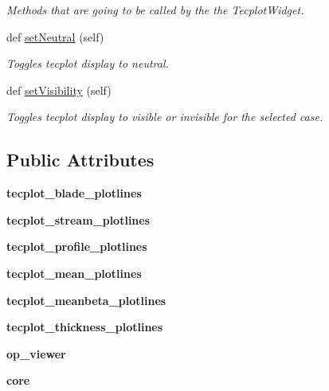 \begin{DoxyCompactItemize}
\begin{DoxyCompactList}\small\item\em Methods that are going to be called by the the Tecplot\+Widget. \end{DoxyCompactList}\item 
def \hyperlink{a00117_ad80163041f7884f536d1421860c4adc2}{set\+Neutral} (self)
\begin{DoxyCompactList}\small\item\em Toggles tecplot display to neutral. \end{DoxyCompactList}\item 
def \hyperlink{a00117_ae50e0f3c4051d791ed30a2e9de5233ea}{set\+Visibility} (self)
\begin{DoxyCompactList}\small\item\em Toggles tecplot display to visible or invisible for the selected case. \end{DoxyCompactList}\end{DoxyCompactItemize}
\subsection*{Public Attributes}
\begin{DoxyCompactItemize}
\item 
\hypertarget{a00117_a97bc6a6c7074f874028cd2afbbad4082}{}\label{a00117_a97bc6a6c7074f874028cd2afbbad4082} 
{\bfseries tecplot\+\_\+blade\+\_\+plotlines}
\item 
\hypertarget{a00117_a103d285631a0d45198d834c8a98cf72a}{}\label{a00117_a103d285631a0d45198d834c8a98cf72a} 
{\bfseries tecplot\+\_\+stream\+\_\+plotlines}
\item 
\hypertarget{a00117_a20a9b77de151d414f78ab14a5ee30143}{}\label{a00117_a20a9b77de151d414f78ab14a5ee30143} 
{\bfseries tecplot\+\_\+profile\+\_\+plotlines}
\item 
\hypertarget{a00117_ad430a4835103d6c1e22b1d81a829bc74}{}\label{a00117_ad430a4835103d6c1e22b1d81a829bc74} 
{\bfseries tecplot\+\_\+mean\+\_\+plotlines}
\item 
\hypertarget{a00117_a552371e32854caef73cb7386140ebab8}{}\label{a00117_a552371e32854caef73cb7386140ebab8} 
{\bfseries tecplot\+\_\+meanbeta\+\_\+plotlines}
\item 
\hypertarget{a00117_a3291e8bf0c5c69a20e3e9299dc363db2}{}\label{a00117_a3291e8bf0c5c69a20e3e9299dc363db2} 
{\bfseries tecplot\+\_\+thickness\+\_\+plotlines}
\item 
\hypertarget{a00117_a03539a28f4d15d303da92341074ab6b6}{}\label{a00117_a03539a28f4d15d303da92341074ab6b6} 
{\bfseries op\+\_\+viewer}
\item 
\hypertarget{a00117_a7d3fabc52fc4c2d52b9aa4efea25131a}{}\label{a00117_a7d3fabc52fc4c2d52b9aa4efea25131a} 
{\bfseries core}
\end{DoxyCompactItemize}


